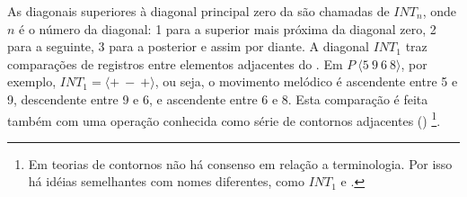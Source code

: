 \begin{table}
  \centering
  \qquad
  \qquad
  \caption{Exemplos de }
  \label{tab:matriz-exemplos}
\end{table}

As diagonais superiores à diagonal principal zero da 
são chamadas de $INT_n$, onde $n$ é o número da diagonal: 1 para a
superior mais próxima da diagonal zero, 2 para a seguinte, 3 para a
posterior e assim por diante. A diagonal $INT_1$ traz comparações de
registros entre elementos adjacentes do . Em
$P\:\langle5\:9\:6\:8\rangle$, por exemplo,
$INT_1=\langle+\:-\:+\rangle$, ou seja, o movimento melódico é
ascendente entre 5 e 9, descendente entre 9 e 6, e ascendente entre 6
e 8. Esta comparação é feita também com uma operação conhecida como
série de contornos adjacentes () \footnote{Em teorias de
  contornos não há consenso em relação a terminologia. Por isso há
  idéias semelhantes com nomes diferentes, como $INT_1$ e 
  \cite{friedmann87:response}.}.

